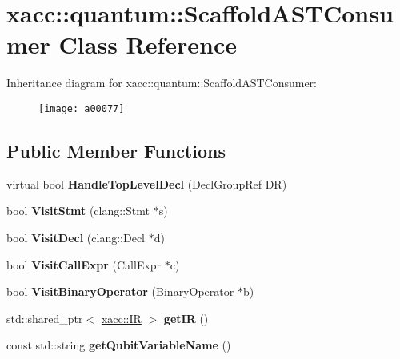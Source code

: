 \hypertarget{a00077}{}\section{xacc\+:\+:quantum\+:\+:Scaffold\+A\+S\+T\+Consumer Class Reference}
\label{a00077}
Inheritance diagram for xacc\+:\+:quantum\+:\+:Scaffold\+A\+S\+T\+Consumer\+:\begin{figure}[H]
\begin{center}
\leavevmode
\texttt{[image: a00077]}
\end{center}
\end{figure}
\subsection*{Public Member Functions}
\begin{DoxyCompactItemize}
\item 
virtual bool {\bfseries Handle\+Top\+Level\+Decl} (Decl\+Group\+Ref DR)\hypertarget{a00077_ae846fd40684f3a1f820b8711e1204089}{}\label{a00077_ae846fd40684f3a1f820b8711e1204089}

\item 
bool {\bfseries Visit\+Stmt} (clang\+::\+Stmt $\ast$s)\hypertarget{a00077_a6693c27f68332d8142fbdcb405e3259b}{}\label{a00077_a6693c27f68332d8142fbdcb405e3259b}

\item 
bool {\bfseries Visit\+Decl} (clang\+::\+Decl $\ast$d)\hypertarget{a00077_ae6a05fe567cd8ea15feb694dbb898c33}{}\label{a00077_ae6a05fe567cd8ea15feb694dbb898c33}

\item 
bool {\bfseries Visit\+Call\+Expr} (Call\+Expr $\ast$c)\hypertarget{a00077_a1478fc9e887b04d2ad2aa8347ef6bbcb}{}\label{a00077_a1478fc9e887b04d2ad2aa8347ef6bbcb}

\item 
bool {\bfseries Visit\+Binary\+Operator} (Binary\+Operator $\ast$b)\hypertarget{a00077_a3f2f070888678caf53e57041b4f5ddd6}{}\label{a00077_a3f2f070888678caf53e57041b4f5ddd6}

\item 
std\+::shared\+\_\+ptr$<$ \hyperlink{a00051}{xacc\+::\+IR} $>$ {\bfseries get\+IR} ()\hypertarget{a00077_af9dbfa7c52b8a7de99132257e154e29a}{}\label{a00077_af9dbfa7c52b8a7de99132257e154e29a}

\item 
const std\+::string {\bfseries get\+Qubit\+Variable\+Name} ()\hypertarget{a00077_aa301f0bcae6fb5a1c17557ba08144cb4}{}\label{a00077_aa301f0bcae6fb5a1c17557ba08144cb4}

\end{DoxyCompactItemize}
